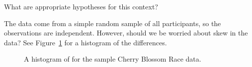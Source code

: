 \begin{exercisewrap}
\begin{nexercise}
What are appropriate hypotheses for this context?\footnotemark{}
\end{nexercise}
\end{exercisewrap}

\begin{exercisewrap}
\begin{nexercise}
The data come from a simple random sample of all participants,
so the observations are independent.
However, should we be worried about skew in the data?
See Figure~\ref{run10SampTimeHistogram} for a histogram
of the differences.\footnotemark{}
\end{nexercise}
\end{exercisewrap}

\begin{figure}[h]
  \centering
  \caption{A histogram of  for the sample
      Cherry Blossom Race data.}
  \label{run10SampTimeHistogram}
\end{figure}

